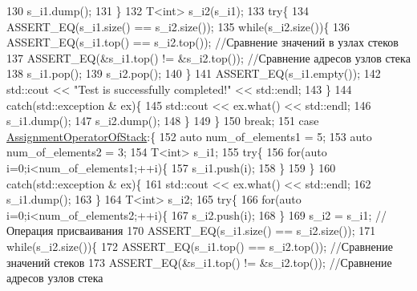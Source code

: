 \begin{DoxyCode}
130                     s\_i1.dump();
131                 \}
132                 T<int> s\_i2(s\_i1);
133                 \textcolor{keywordflow}{try}\{
134                     ASSERT\_EQ(s\_i1.size() == s\_i2.size());
135                     \textcolor{keywordflow}{while}(s\_i2.size())\{
136                         ASSERT\_EQ(s\_i1.top() == s\_i2.top());   \textcolor{comment}{//Сравнение значений в узлах стеков}
137                         ASSERT\_EQ(&s\_i1.top() != &s\_i2.top()); \textcolor{comment}{//Сравнение адресов узлов стека}
138                         s\_i1.pop();
139                         s\_i2.pop();
140                     \}
141                     ASSERT\_EQ(s\_i1.empty());
142                     std::cout << \textcolor{stringliteral}{"Test is successfully completed!"} << std::endl;
143                 \}
144                 \textcolor{keywordflow}{catch}(std::exception & ex)\{
145                     std::cout << ex.what() << std::endl;
146                     s\_i1.dump();
147                     s\_i2.dump();
148                 \}
149                               \}
150                 \textcolor{keywordflow}{break};
151             \textcolor{keywordflow}{case} \hyperlink{namespacestk__test_aee7ec7a767abf7b0b65ce9a2afb7de78adc3b2cd62978794a43af9212cd2c6be7}{AssignmentOperatorOfStack}:\{
152                 \textcolor{keyword}{auto} num\_of\_elements1 = 5;
153                 \textcolor{keyword}{auto} num\_of\_elements2 = 3;
154                 T<int> s\_i1;
155                 \textcolor{keywordflow}{try}\{
156                     \textcolor{keywordflow}{for}(\textcolor{keyword}{auto} i=0;i<num\_of\_elements1;++i)\{
157                         s\_i1.push(i);
158                     \}
159                 \}
160                 \textcolor{keywordflow}{catch}(std::exception & ex)\{
161                     std::cout << ex.what() << std::endl;
162                     s\_i1.dump();
163                 \}
164                 T<int> s\_i2;
165                 \textcolor{keywordflow}{try}\{
166                     \textcolor{keywordflow}{for}(\textcolor{keyword}{auto} i=0;i<num\_of\_elements2;++i)\{
167                         s\_i2.push(i);
168                     \}
169                     s\_i2 = s\_i1;                               \textcolor{comment}{//Операция присваивания}
170                     ASSERT\_EQ(s\_i1.size() == s\_i2.size());
171                     \textcolor{keywordflow}{while}(s\_i2.size())\{
172                         ASSERT\_EQ(s\_i1.top() == s\_i2.top());   \textcolor{comment}{//Сравнение значений стеков}
173                         ASSERT\_EQ(&s\_i1.top() != &s\_i2.top()); \textcolor{comment}{//Сравнение адресов узлов стека}

\end{DoxyCode}
